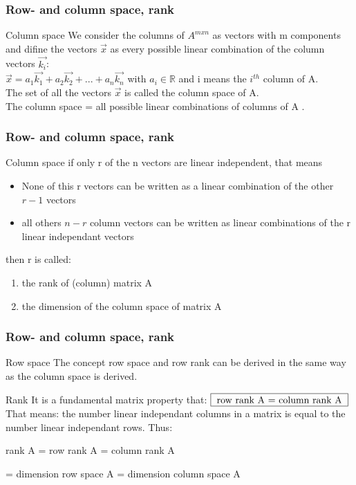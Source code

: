 \begin{frame}
	\frametitle{Row- and column space, rank}
	\begin{block}{Column space}
		We consider the columns of $A^{mxn}$ as vectors with m components and difine the vectors $\overrightarrow{x}$ as every possible linear combination of the column vectors $\overrightarrow{k_i}$:\\
		$\overrightarrow{x}=a_1\overrightarrow{k_1}+a_2\overrightarrow{k_2}+...+a_n\overrightarrow{k_n}$ with $a_i\in\mathbb{R}$ and i means the $i^{th}$ column of A.\\
		The set of all the vectors $\overrightarrow{x}$ is called the column space of A.\\
		The column space = all possible linear combinations of columns of A .
		\end{block}
\end{frame}

\begin{frame}
	\frametitle{Row- and column space, rank}
	\begin{block}{Column space}
		if only r of the n vectors are linear independent, that means\\
		\begin{itemize}
			\item None of this r vectors can be written as a linear combination of the other $r-1$ vectors
			\item all others $n-r$ column vectors can be written as linear combinations of the r linear independant vectors
		\end{itemize} 
		then r is called:
		\begin{enumerate}
			\item the rank of (column) matrix A
 			\item the dimension of the column space of matrix A
		\end{enumerate}
	\end{block}
\end{frame}

\begin{frame}
	\frametitle{Row- and column space, rank}
	\begin{block}{Row space}
		The concept row space and row rank can be derived in the same way as the column space is derived.
	\end{block}
	\begin{block}{Rank}
		It is a fundamental matrix property that: $\framebox[1.1\width]{row rank A = column rank A}$\\
		That means: the number linear independant columns in a matrix is equal to the number linear independant rows. Thus: \\
		{rank A = row rank A = column rank A \par
		= dimension row space A = dimension column space A} 	
	\end{block}
\end{frame}

